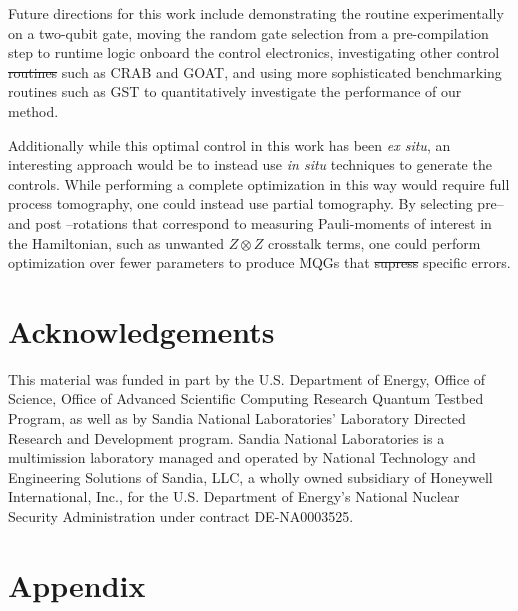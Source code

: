 \documentclass[aps,nofootinbib,pra,notitlepage,twocolumn]{revtex4-1}
\newcommand{\0}{\ensuremath{\mathbf{0}}}
\providecommand{\DIFaddtex}[1]{{\protect\color{blue}\uwave{#1}}} %
\providecommand{\DIFdeltex}[1]{{\protect\color{red}\sout{#1}}}                      %
\providecommand{\DIFaddbegin}{} %
\providecommand{\DIFaddend}{} %
\providecommand{\DIFdelbegin}{} %
\providecommand{\DIFdelend}{} %
\providecommand{\DIFadd}[1]{\texorpdfstring{\DIFaddtex{#1}}{#1}} %
\providecommand{\DIFdel}[1]{\texorpdfstring{\DIFdeltex{#1}}{}} %
\newcommand{\DIFscaledelfig}{0.5}
\newlength{\DIFdelgraphicswidth} %
\newlength{\DIFdelgraphicsheight} %
\newcommand{\DIFaddincludegraphics}[2][]{{\color{blue}\fbox{\DIFOincludegraphics[#1]{#2}}}} %
\newcommand{\DIFdelincludegraphics}[2][]{%
\sbox{\DIFdelgraphicsbox}{\DIFOincludegraphics[#1]{#2}}%
\settoboxwidth{\DIFdelgraphicswidth}{\DIFdelgraphicsbox} %
\settoboxtotalheight{\DIFdelgraphicsheight}{\DIFdelgraphicsbox} %
\scalebox{\DIFscaledelfig}{%
\parbox[b]{\DIFdelgraphicswidth}{\usebox{\DIFdelgraphicsbox}\\[-\baselineskip] \rule{\DIFdelgraphicswidth}{0em}}\llap{\resizebox{\DIFdelgraphicswidth}{\DIFdelgraphicsheight}{%
\setlength{\unitlength}{\DIFdelgraphicswidth}%
\begin{picture}(1,1)%
\thicklines\linethickness{2pt} %
{\color[rgb]{1,0,0}\put(0,0){\framebox(1,1){}}}%
{\color[rgb]{1,0,0}\put(0,0){\line( 1,1){1}}}%
{\color[rgb]{1,0,0}\put(0,1){\line(1,-1){1}}}%
\end{picture}%
}\hspace*{3pt}}} %
} %
\DeclareRobustCommand{\DIFaddbegin}{\DIFOaddbegin \let\includegraphics\DIFaddincludegraphics} %
\DeclareRobustCommand{\DIFaddend}{\DIFOaddend \let\includegraphics\DIFOincludegraphics} %
\DeclareRobustCommand{\DIFdelbegin}{\DIFOdelbegin \let\includegraphics\DIFdelincludegraphics} %
\DeclareRobustCommand{\DIFdelend}{\DIFOaddend \let\includegraphics\DIFOincludegraphics} %
\begin{document}
{Future directions for this work include demonstrating the routine experimentally on a two-qubit gate, moving the random gate selection from a pre-compilation step to runtime logic onboard the control electronics, investigating other control \DIFdelbegin \DIFdel{routines }\DIFdelend \DIFaddbegin \DIFadd{generation algorithms }\DIFaddend such as CRAB \cite{Caneva2011} and GOAT\cite{Machnes2018}, and using more sophisticated benchmarking routines such as GST\cite{BlumeKohout2017} to quantitatively investigate the performance of our method.

Additionally while this optimal control in this work has been \textit{ex situ}, an interesting approach would be to instead use \textit{in situ} techniques \cite{Wu2018, Kelly2014, Ferrie2015} to generate the controls. While performing a complete optimization in this way would require full process tomography, one could instead use partial tomography. By selecting pre-- and post --rotations that correspond to measuring Pauli-moments of interest in the Hamiltonian, such as unwanted $Z\otimes Z$ crosstalk terms, one could perform optimization over fewer parameters to produce MQGs that \DIFdelbegin \DIFdel{supress }\DIFdelend \DIFaddbegin \DIFadd{suppress }\DIFaddend specific errors.


\section{Acknowledgements}
\label{sec:acknowledgements}
This material was funded in part by the U.S. Department of Energy, Office of Science, Office of Advanced Scientific Computing Research Quantum Testbed Program, as well as by Sandia National Laboratories' Laboratory Directed Research and Development program. Sandia National Laboratories is a multimission laboratory managed and operated by National Technology and Engineering Solutions of Sandia, LLC, a wholly owned subsidiary of Honeywell International, Inc., for the U.S. Department of Energy's National Nuclear Security Administration under contract DE-NA0003525.


\section{Appendix}
\label{sec:appendix}

}
\end{document}
